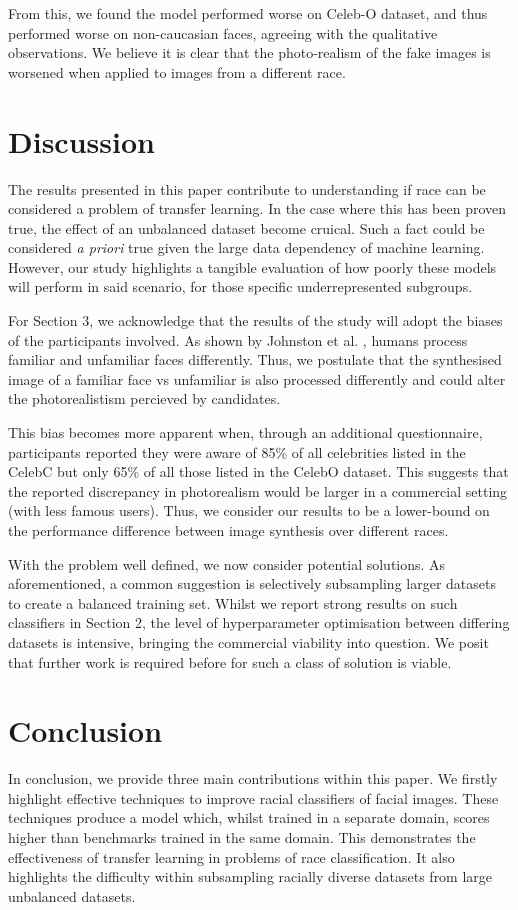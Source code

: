 \documentclass[10pt,twocolumn,letterpaper]{article}
\begin{document}
From this, we found the model performed worse on Celeb-O dataset, and thus performed worse on non-caucasian faces, agreeing with the qualitative observations. We believe it is clear that the photo-realism of the fake images is worsened when applied to images from a different race.

\section{Discussion}

The results presented in this paper contribute to understanding if race can be considered a problem of transfer learning. In the case where this has been proven true, the effect of an unbalanced dataset become cruical. Such a fact could be considered \textit{a priori} true given the large data dependency of machine learning. However, our study highlights a tangible evaluation of how poorly these models will perform in said scenario, for those specific underrepresented subgroups. 

For Section 3, we acknowledge that the results of the study will adopt the biases of the participants involved. As shown by Johnston et al. \cite{johnston2009familiar}, humans process familiar and unfamiliar faces differently. Thus, we postulate that the synthesised image of a familiar face vs unfamiliar is also processed differently and could alter the photorealistism percieved by candidates. 

This bias becomes more apparent when, through an additional questionnaire, participants reported they were aware of 85\% of all celebrities listed in the CelebC but only 65\% of all those listed in the CelebO dataset. This suggests that the reported discrepancy in photorealism would be larger in a commercial setting (with less famous users). Thus, we consider our results to be a lower-bound on the performance difference between image synthesis over different races.

With the problem well defined, we now consider potential solutions. As aforementioned, a common suggestion is selectively subsampling larger datasets to create a balanced training set. Whilst we report strong results on such classifiers in Section 2, the level of hyperparameter optimisation between differing datasets is intensive, bringing the commercial viability into question. We posit that further work is  required before for such a class of solution is viable.


\section{Conclusion}
In conclusion, we provide three main contributions within this paper. We firstly highlight effective techniques to improve racial classifiers of facial images. These techniques produce a model which, whilst trained in a separate domain, scores higher than benchmarks trained in the same domain. This demonstrates the effectiveness of transfer learning in problems of race classification. It also highlights the difficulty within subsampling racially diverse datasets from large unbalanced datasets.
\end{document}
